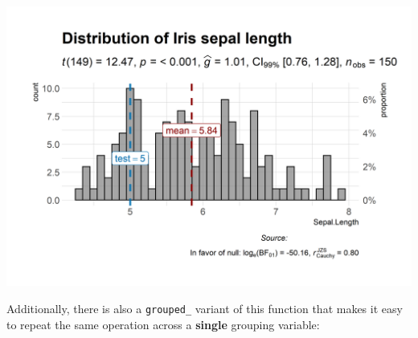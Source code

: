 \documentclass[
]{article}
\begin{document}
\includegraphics[width=1\linewidth]{./figures/paper-gghistostats1-1}

Additionally, there is also a \texttt{grouped\_} variant of this function that makes it
easy to repeat the same operation across a \textbf{single} grouping variable:
\end{document}

